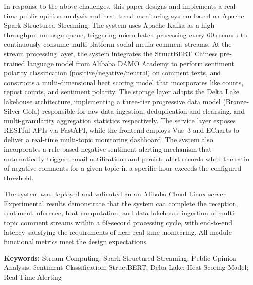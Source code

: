 In response to the above challenges, this paper designs and implements a real-time public opinion analysis and heat trend monitoring system based on Apache Spark Structured Streaming. The system uses Apache Kafka as a high-throughput message queue, triggering micro-batch processing every 60 seconds to continuously consume multi-platform social media comment streams. At the stream processing layer, the system integrates the StructBERT Chinese pre-trained language model from Alibaba DAMO Academy to perform sentiment polarity classification (positive/negative/neutral) on comment texts, and constructs a multi-dimensional heat scoring model that incorporates like counts, repost counts, and sentiment polarity. The storage layer adopts the Delta Lake lakehouse architecture, implementing a three-tier progressive data model (Bronze-Silver-Gold) responsible for raw data ingestion, deduplication and cleansing, and multi-granularity aggregation statistics respectively. The service layer exposes RESTful APIs via FastAPI, while the frontend employs Vue~3 and ECharts to deliver a real-time multi-topic monitoring dashboard. The system also incorporates a rule-based negative sentiment alerting mechanism that automatically triggers email notifications and persists alert records when the ratio of negative comments for a given topic in a specific hour exceeds the configured threshold.

The system was deployed and validated on an Alibaba Cloud Linux server. Experimental results demonstrate that the system can complete the reception, sentiment inference, heat computation, and data lakehouse ingestion of multi-topic comment streams within a 60-second processing cycle, with end-to-end latency satisfying the requirements of near-real-time monitoring. All module functional metrics meet the design expectations.

\vspace{1em}
\noindent\textbf{Keywords:} Stream Computing; Spark Structured Streaming; Public Opinion Analysis; Sentiment Classification; StructBERT; Delta Lake; Heat Scoring Model; Real-Time Alerting

\clearpage
